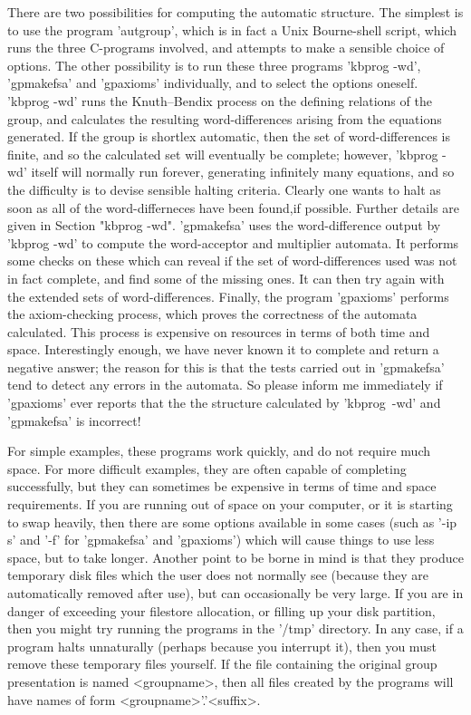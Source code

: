 There are two possibilities for computing the automatic structure.
The simplest is to use the program 'autgroup', which is in fact a
Unix Bourne-shell script, which runs the three C-programs involved,
and attempts to make a sensible choice of options.
The other possibility is to run these three programs 'kbprog -wd',
'gpmakefsa' and 'gpaxioms' individually, and to select the options oneself.
'kbprog -wd' runs the Knuth--Bendix process on the defining relations of the
group, and calculates the resulting word-differences arising from the
equations generated. If the group is shortlex automatic, then the set
of word-differences is finite, and so the calculated set will eventually
be complete; however, 'kbprog -wd' itself will normally run forever, generating
infinitely many equations, and so the difficulty is to devise sensible
halting criteria. Clearly one wants to halt as soon as all of the
word-differneces have been found,if possible. Further details are given in
Section "kbprog -wd". 'gpmakefsa' uses the word-difference output by
'kbprog -wd' to compute the word-acceptor and multiplier automata.
It performs some checks on these which can reveal if the set of
word-differences used was not in fact complete, and find some of the
missing ones. It can then try again with the extended sets of
word-differences. Finally, the program 'gpaxioms' performs the
axiom-checking process, which proves the correctness of the automata
calculated. This process is expensive on resources in terms of both time
and space. Interestingly enough, we have never known it to complete and
return a negative answer; the reason for this is that the tests carried
out in 'gpmakefsa' tend to detect any errors in the automata.
So please inform me immediately if 'gpaxioms' ever reports that the
the structure calculated by 'kbprog\ -wd' and 'gpmakefsa' is incorrect!

For simple examples, these programs work quickly, and do not require
much space. For more difficult examples, they are often capable of
completing successfully, but they can sometimes be expensive in terms of
time and space requirements. If you are running out of space on your computer,
or it is starting to swap heavily, then there are some options available
in some cases (such as '-ip s' and '-f' for 'gpmakefsa' and 'gpaxioms')
which will cause things to use less space, but to take longer.
Another point to be borne in mind is that they produce temporary disk
files which the user does not normally see (because they are
automatically removed after use), but can occasionally be very large.
If you are in danger of exceeding your filestore allocation, or filling up
your disk partition, then you might try running the programs in the '/tmp'
directory. In any case, if a program halts unnaturally (perhaps because
you interrupt it), then you must remove these temporary files yourself.
If the file containing the original group presentation is  named
<groupname>, then all files created by the programs will have names of
form <groupname>'.'<suffix>.

